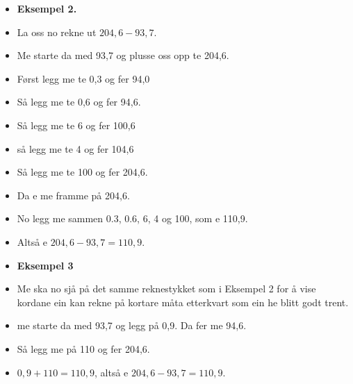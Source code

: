 \documentclass[english,hidelinks,pdftex, 11 pt, class=report,crop=false]{standalone}
\begin{document}
\begin{itemize}
\item \textbf{Eksempel 2.}
\item La oss no rekne ut $ 204,6-93,7  $. 
\item Me starte da med 93,7 og plusse oss opp te 204,6.
\item Først legg me te 0,3 og fer 94,0
\item Så legg me te 0,6 og fer 94,6.
\item Så legg me te 6 og fer 100,6
\item så legg me te 4 og fer 104,6
\item Så legg me te 100 og fer 204,6.
\item Da e me framme på 204,6.
\item No legg me sammen 0.3, 0.6, 6, 4 og 100, som e 110,9.
\item Altså e $ 204,6-93,7=110,9 $.
\end{itemize}
\begin{itemize}
	\item \textbf{Eksempel 3}
	\item Me ska no sjå på det samme reknestykket som i Eksempel 2 for å vise kordane ein kan rekne på kortare måta etterkvart som ein he blitt godt trent.
	\item me starte da med 93,7 og legg på 0,9. Da fer me 94,6.
	\item Så legg me på 110 og fer 204,6.
	\item $ 0,9+110=110,9 $, altså e $ 204,6-93,7=110,9 $.
\end{itemize}
\end{document}
